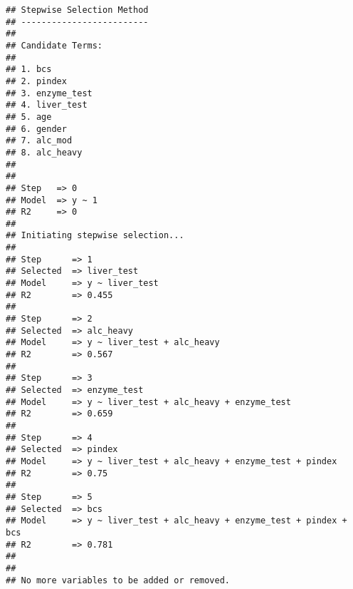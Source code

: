 \documentclass[
]{article}
\begin{document}
\begin{verbatim}
## Stepwise Selection Method 
## -------------------------
## 
## Candidate Terms: 
## 
## 1. bcs 
## 2. pindex 
## 3. enzyme_test 
## 4. liver_test 
## 5. age 
## 6. gender 
## 7. alc_mod 
## 8. alc_heavy 
## 
## 
## Step   => 0 
## Model  => y ~ 1 
## R2     => 0 
## 
## Initiating stepwise selection... 
## 
## Step      => 1 
## Selected  => liver_test 
## Model     => y ~ liver_test 
## R2        => 0.455 
## 
## Step      => 2 
## Selected  => alc_heavy 
## Model     => y ~ liver_test + alc_heavy 
## R2        => 0.567 
## 
## Step      => 3 
## Selected  => enzyme_test 
## Model     => y ~ liver_test + alc_heavy + enzyme_test 
## R2        => 0.659 
## 
## Step      => 4 
## Selected  => pindex 
## Model     => y ~ liver_test + alc_heavy + enzyme_test + pindex 
## R2        => 0.75 
## 
## Step      => 5 
## Selected  => bcs 
## Model     => y ~ liver_test + alc_heavy + enzyme_test + pindex + bcs 
## R2        => 0.781 
## 
## 
## No more variables to be added or removed.
\end{verbatim}
\end{document}
